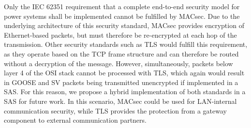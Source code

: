 \documentclass[conference, onecolumn, a4paper]{IEEEtran}
\begin{document}
\smallskip
Only the IEC 62351 requirement that a complete end-to-end security model for power systems shall be implemented \cite{Review_IEC62351:2019} cannot be 
fulfilled by MACsec. Due to the underlying architecture of this security standard, MACsec provides encryption of Ethernet-based packets, but must therefore 
be re-encrypted at each hop of the transmission. Other security standards such as TLS would fulfill this requirement, as they operate based on the TCP 
frame structure and can therefore be routed without a decryption of the message. However, simultaneously, packets below layer 4 of the OSI stack cannot 
be processed with TLS, which again would result in GOOSE and SV packets being transmitted unencrypted if implemented in a SAS. For this reason, we propose 
a hybrid implementation of both standards in a SAS for future work. In this scenario, MACsec could be used for LAN-internal communication security, while 
TLS provides the protection from a gateway component to external communication partners.    

\printbibliography
\end{document}
